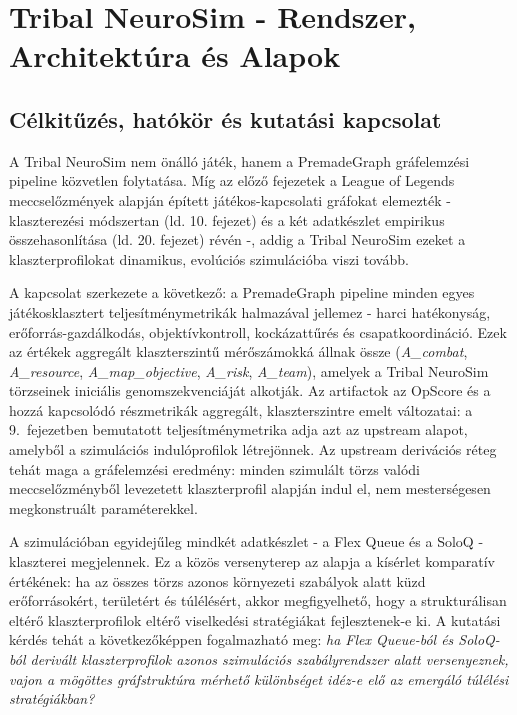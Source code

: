 \chapter{Tribal NeuroSim - Rendszer, Architektúra és Alapok}

\section{Célkitűzés, hatókör és kutatási kapcsolat}
\label{sec:neurosim-24-scope}

A Tribal NeuroSim nem önálló játék, hanem a PremadeGraph gráfelemzési pipeline közvetlen folytatása.
Míg az előző fejezetek a League of Legends meccselőzmények alapján épített játékos-kapcsolati gráfokat elemezték -
klaszterezési módszertan (ld. 10. fejezet) és a két adatkészlet empirikus összehasonlítása (ld. 20. fejezet) révén -,
addig a Tribal NeuroSim ezeket a klaszterprofilokat dinamikus, evolúciós szimulációba viszi tovább.

A kapcsolat szerkezete a következő: a PremadeGraph pipeline minden egyes játékosklasztert
teljesítménymetrikák halmazával jellemez - harci hatékonyság, erőforrás-gazdálkodás, objektívkontroll,
kockázattűrés és csapatkoordináció. Ezek az értékek aggregált klaszterszintű mérőszámokká állnak össze
(\textit{A\_combat}, \textit{A\_resource}, \textit{A\_map\_objective}, \textit{A\_risk}, \textit{A\_team}),
amelyek a Tribal NeuroSim törzseinek iniciális genomszekvenciáját alkotják. Az artifactok
az OpScore és a hozzá kapcsolódó részmetrikák aggregált, klaszterszintre emelt változatai:
a 9.~fejezetben bemutatott teljesítménymetrika adja azt az upstream alapot, amelyből a
szimulációs indulóprofilok létrejönnek.
Az upstream derivációs réteg tehát maga a gráfelemzési eredmény: minden szimulált törzs valódi
meccselőzményből levezetett klaszterprofil alapján indul el, nem mesterségesen megkonstruált paraméterekkel.

A szimulációban egyidejűleg mindkét adatkészlet - a Flex Queue és a SoloQ - klaszterei megjelennek.
Ez a közös versenyterep az alapja a kísérlet komparatív értékének: ha az összes törzs azonos
környezeti szabályok alatt küzd erőforrásokért, területért és túlélésért, akkor megfigyelhető,
hogy a strukturálisan eltérő klaszterprofilok eltérő viselkedési stratégiákat fejlesztenek-e ki.
A kutatási kérdés tehát a következőképpen fogalmazható meg:
\textit{ha Flex Queue-ból és SoloQ-ból derivált klaszterprofilok azonos szimulációs szabályrendszer
alatt versenyeznek, vajon a mögöttes gráfstruktúra mérhető különbséget idéz-e elő az emergáló
túlélési stratégiákban?}

